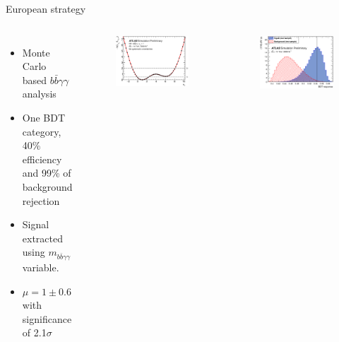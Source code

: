 \begin{frame}{European strategy}
\begin{columns}
\begin{itemize}
    \item Monte Carlo based $b\bar{b}\gamma\gamma$ analysis
    \item One BDT category, 40\% efficiency and 99\% of background rejection
    \item Signal extracted using $m_{b\bar{b}\gamma\gamma}$ variable.
    \item $\mu = 1 \pm 0.6$ with significance of 2.1$\sigma$
\end{itemize}

\begin{figure}
    \centering
    \includegraphics[width=1.\textwidth]{BackUp/Part4/Img/figures_bbyy_NoSyst_likelihoodCurve_-3to10.eps}
\end{figure}

\begin{figure}
    \centering
    \includegraphics[width=.9\textwidth]{BackUp/Part4/Img/figures_bbyy_overtrainTestOnly.eps}
\end{figure}


\end{columns}
\end{frame}
